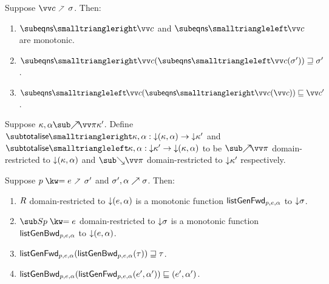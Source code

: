 \begin{lemma}
  \label{lem:aux:clauses:gc}
  Suppose $\vec{c} \clauseFwd \sigma$. Then:
  \begin{enumerate}
     \item $\desugarClausesFwdF{\vec{c}}$ and $\desugarClausesBwdF{\vec{c}}$ are monotonic.
     \item $\desugarClausesFwdF{\vec{c}}(\desugarClausesBwdF{\vec{c}}(\sigma')) \geq \sigma'$.
     \item $\desugarClausesBwdF{\vec{c}}(\desugarClausesFwdF{\vec{c}}(\vec{c})) \leq \vec{c}'$.
  \end{enumerate}
\end{lemma}

\begin{definition}
   Suppose $\totaliseFwd{\kappa}{\alpha}{\vec{\pi}}{\kappa'}$. Define $\totaliseFwdF{\kappa,\alpha}: \Below{(\kappa,\alpha)} \to \Below{\kappa'}$ and $\totaliseBwdF{\kappa,\alpha}: \Below{\kappa'} \to \Below{(\kappa,\alpha)}$ to be $\totaliseFwdR{\vec{\pi}}$ domain-restricted to ${\downarrow}{(\kappa,\alpha)}$ and $\totaliseBwdR{\vec{\pi}}$ domain-restricted to ${\downarrow}{\kappa'}$ respectively.
\end{definition}

\begin{lemma}
  \label{lem:aux:list-gen:gc}
  \item
  Suppose $\clauseUncurried{p}{e} \clauseFwd \sigma'$ and ${\sigma'},{\alpha} \nearrow {\sigma}$. Then:
  \begin{enumerate}
     \item $\mathrel{R}$ domain-restricted to ${\downarrow}{(e, \alpha)}$ is a monotonic function $\mathsf{listGenFwd}_{p, e, \alpha}$ to ${\downarrow}{\sigma}$.
     \item $\listGenBwd{\clauseUncurried{p}{e}}$ domain-restricted to ${\downarrow}{\sigma}$ is a monotonic function $\mathsf{listGenBwd}_{p, e, \alpha}$ to ${\downarrow}{(e, \alpha)}$.
     \item $\mathsf{listGenFwd}_{p, e, \alpha}(\mathsf{listGenBwd}_{p, e, \alpha}(\tau)) \sqsupseteq \tau$.
     \item $\mathsf{listGenBwd}_{p, e, \alpha}(\mathsf{listGenFwd}_{p, e, \alpha}(e', \alpha')) \sqsubseteq (e', \alpha')$.
  \end{enumerate}
\end{lemma}
